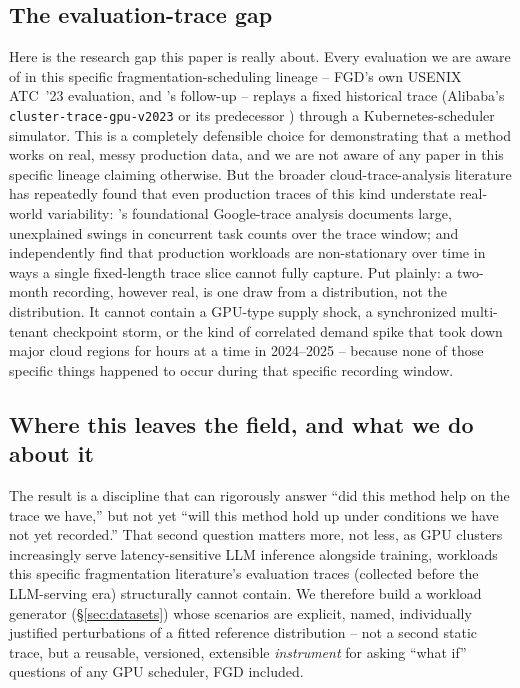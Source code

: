 \documentclass[11pt]{article}
\begin{document}
\subsection{The evaluation-trace gap}
Here is the research gap this paper is really about. Every evaluation we
are aware of in this specific fragmentation-scheduling lineage -- FGD's
own USENIX ATC~'23 evaluation, and \citet{pwr2024}'s follow-up -- replays
a fixed historical trace (Alibaba's \texttt{cluster-trace-gpu-v2023}
\citep{alibabatrace2023} or its predecessor \citep{alibabatrace2020})
through a Kubernetes-scheduler simulator. This is a completely defensible
choice for demonstrating that a method works on real, messy production
data, and we are not aware of any paper in this specific lineage claiming
otherwise. But the broader cloud-trace-analysis literature has
repeatedly found that even production traces of this kind understate
real-world variability: \citet{reiss2012}'s foundational Google-trace
analysis documents large, unexplained swings in concurrent task counts
over the trace window; \citet{cortez2017} and \citet{shahrad2020}
independently find that production workloads are non-stationary over
time in ways a single fixed-length trace slice cannot fully capture. Put
plainly: a two-month recording, however real, is one draw from a
distribution, not the distribution. It cannot contain a GPU-type supply
shock, a synchronized multi-tenant checkpoint storm, or the kind of
correlated demand spike that took down major cloud regions for hours at a
time in 2024--2025 \citep{awsoutage2025,outagestats2025} -- because
none of those specific things happened to occur during that
specific recording window.

\subsection{Where this leaves the field, and what we do about it}
The result is a discipline that can rigorously answer ``did this method
help on the trace we have,'' but not yet ``will this method hold up under
conditions we have not yet recorded.'' That second question matters more,
not less, as GPU clusters increasingly serve latency-sensitive LLM
inference alongside training, workloads this specific fragmentation
literature's evaluation traces (collected before the LLM-serving era)
structurally cannot contain. We therefore build a workload generator
(\S\ref{sec:datasets}) whose scenarios are explicit, named, individually
justified perturbations of a fitted reference distribution --
not a second static trace, but a reusable, versioned, extensible
\emph{instrument} for asking ``what if'' questions of any GPU scheduler,
FGD included.
\end{document}
